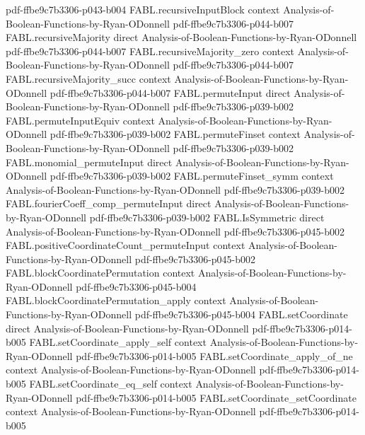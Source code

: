 \begin{theorem}
  {pdf-ffbe9c7b3306-p043-b004}
\proofstep
  {FABL.recursiveInputBlock}
  {context}
  {Analysis-of-Boolean-Functions-by-Ryan-ODonnell}
  {pdf-ffbe9c7b3306-p044-b007}
\proofstep
  {FABL.recursiveMajority}
  {direct}
  {Analysis-of-Boolean-Functions-by-Ryan-ODonnell}
  {pdf-ffbe9c7b3306-p044-b007}
\proofstep
  {FABL.recursiveMajority_zero}
  {context}
  {Analysis-of-Boolean-Functions-by-Ryan-ODonnell}
  {pdf-ffbe9c7b3306-p044-b007}
\proofstep
  {FABL.recursiveMajority_succ}
  {context}
  {Analysis-of-Boolean-Functions-by-Ryan-ODonnell}
  {pdf-ffbe9c7b3306-p044-b007}
\proofstep
  {FABL.permuteInput}
  {direct}
  {Analysis-of-Boolean-Functions-by-Ryan-ODonnell}
  {pdf-ffbe9c7b3306-p039-b002}
\proofstep
  {FABL.permuteInputEquiv}
  {context}
  {Analysis-of-Boolean-Functions-by-Ryan-ODonnell}
  {pdf-ffbe9c7b3306-p039-b002}
\proofstep
  {FABL.permuteFinset}
  {context}
  {Analysis-of-Boolean-Functions-by-Ryan-ODonnell}
  {pdf-ffbe9c7b3306-p039-b002}
\proofstep
  {FABL.monomial_permuteInput}
  {direct}
  {Analysis-of-Boolean-Functions-by-Ryan-ODonnell}
  {pdf-ffbe9c7b3306-p039-b002}
\proofstep
  {FABL.permuteFinset_symm}
  {context}
  {Analysis-of-Boolean-Functions-by-Ryan-ODonnell}
  {pdf-ffbe9c7b3306-p039-b002}
\proofstep
  {FABL.fourierCoeff_comp_permuteInput}
  {direct}
  {Analysis-of-Boolean-Functions-by-Ryan-ODonnell}
  {pdf-ffbe9c7b3306-p039-b002}
\proofstep
  {FABL.IsSymmetric}
  {direct}
  {Analysis-of-Boolean-Functions-by-Ryan-ODonnell}
  {pdf-ffbe9c7b3306-p045-b002}
\proofstep
  {FABL.positiveCoordinateCount_permuteInput}
  {context}
  {Analysis-of-Boolean-Functions-by-Ryan-ODonnell}
  {pdf-ffbe9c7b3306-p045-b002}
\proofstep
  {FABL.blockCoordinatePermutation}
  {context}
  {Analysis-of-Boolean-Functions-by-Ryan-ODonnell}
  {pdf-ffbe9c7b3306-p045-b004}
\proofstep
  {FABL.blockCoordinatePermutation_apply}
  {context}
  {Analysis-of-Boolean-Functions-by-Ryan-ODonnell}
  {pdf-ffbe9c7b3306-p045-b004}
\proofstep
  {FABL.setCoordinate}
  {direct}
  {Analysis-of-Boolean-Functions-by-Ryan-ODonnell}
  {pdf-ffbe9c7b3306-p014-b005}
\proofstep
  {FABL.setCoordinate_apply_self}
  {context}
  {Analysis-of-Boolean-Functions-by-Ryan-ODonnell}
  {pdf-ffbe9c7b3306-p014-b005}
\proofstep
  {FABL.setCoordinate_apply_of_ne}
  {context}
  {Analysis-of-Boolean-Functions-by-Ryan-ODonnell}
  {pdf-ffbe9c7b3306-p014-b005}
\proofstep
  {FABL.setCoordinate_eq_self}
  {context}
  {Analysis-of-Boolean-Functions-by-Ryan-ODonnell}
  {pdf-ffbe9c7b3306-p014-b005}
\proofstep
  {FABL.setCoordinate_setCoordinate}
  {context}
  {Analysis-of-Boolean-Functions-by-Ryan-ODonnell}
  {pdf-ffbe9c7b3306-p014-b005}

\end{theorem}
